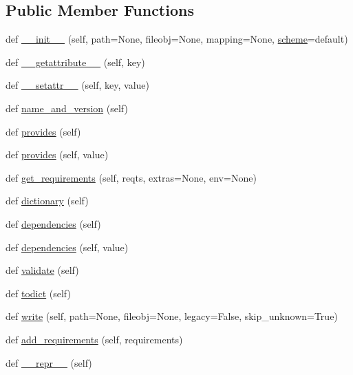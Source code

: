 \subsection*{Public Member Functions}
\begin{DoxyCompactItemize}
\item 
def \hyperlink{classpip_1_1__vendor_1_1distlib_1_1metadata_1_1Metadata_a100e20a955203ecb510ad8e7b59ba7df}{\+\_\+\+\_\+init\+\_\+\+\_\+} (self, path=None, fileobj=None, mapping=None, \hyperlink{classpip_1_1__vendor_1_1distlib_1_1metadata_1_1Metadata_ad7c506d0aff98490bb2f43d675be68af}{scheme}=\textquotesingle{}default\textquotesingle{})
\item 
def \hyperlink{classpip_1_1__vendor_1_1distlib_1_1metadata_1_1Metadata_af145a3cc06f87a30ac2b2102c5d7f341}{\+\_\+\+\_\+getattribute\+\_\+\+\_\+} (self, key)
\item 
def \hyperlink{classpip_1_1__vendor_1_1distlib_1_1metadata_1_1Metadata_a5a0a9fefd6f17ea49aa9c474cb65209e}{\+\_\+\+\_\+setattr\+\_\+\+\_\+} (self, key, value)
\item 
def \hyperlink{classpip_1_1__vendor_1_1distlib_1_1metadata_1_1Metadata_a958dc84c5959001c3c94c99c262c8268}{name\+\_\+and\+\_\+version} (self)
\item 
def \hyperlink{classpip_1_1__vendor_1_1distlib_1_1metadata_1_1Metadata_a700307186309aa299c50bbe7515cb58d}{provides} (self)
\item 
def \hyperlink{classpip_1_1__vendor_1_1distlib_1_1metadata_1_1Metadata_a058ff05fbfaee325e2adc105f9ff6748}{provides} (self, value)
\item 
def \hyperlink{classpip_1_1__vendor_1_1distlib_1_1metadata_1_1Metadata_a372528ac411fd419ac0f6ff4306e7290}{get\+\_\+requirements} (self, reqts, extras=None, env=None)
\item 
def \hyperlink{classpip_1_1__vendor_1_1distlib_1_1metadata_1_1Metadata_a3b22b5416933750ac4e0de8f43ff6e2b}{dictionary} (self)
\item 
def \hyperlink{classpip_1_1__vendor_1_1distlib_1_1metadata_1_1Metadata_adc47179e053c09b069ed6603156885da}{dependencies} (self)
\item 
def \hyperlink{classpip_1_1__vendor_1_1distlib_1_1metadata_1_1Metadata_a20c44e90c74dc87e8639a1db4dacb9cd}{dependencies} (self, value)
\item 
def \hyperlink{classpip_1_1__vendor_1_1distlib_1_1metadata_1_1Metadata_a19d6c7da3d1e3f4155a59dc4b6fd3ffa}{validate} (self)
\item 
def \hyperlink{classpip_1_1__vendor_1_1distlib_1_1metadata_1_1Metadata_a4885b3e47d3f6ba4dfd5ea7d3af29244}{todict} (self)
\item 
def \hyperlink{classpip_1_1__vendor_1_1distlib_1_1metadata_1_1Metadata_a1765c04d32c8b3e84ad87b6083694569}{write} (self, path=None, fileobj=None, legacy=False, skip\+\_\+unknown=True)
\item 
def \hyperlink{classpip_1_1__vendor_1_1distlib_1_1metadata_1_1Metadata_aa5d0c9aa256b9eb979330d4c8a08212a}{add\+\_\+requirements} (self, requirements)
\item 
def \hyperlink{classpip_1_1__vendor_1_1distlib_1_1metadata_1_1Metadata_a08105ca0987f9e74cb1341a463d6cbe5}{\+\_\+\+\_\+repr\+\_\+\+\_\+} (self)
\end{DoxyCompactItemize}
